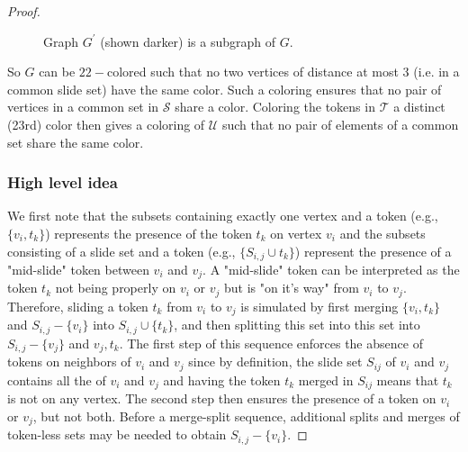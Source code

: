 \begin{proof}
\begin{figure} [H]
  \caption{Graph $G^{'}$ (shown darker) is a subgraph of $G$.}
  \label{fig:subgraph}
\end{figure}


So $G$ can be $22-$colored such that no two vertices of distance at most $3$ (i.e. in a common slide set) have the same color. Such a coloring
ensures that no pair of vertices in a common set in $\mathcal{S}$ share a color. Coloring the tokens in $\mathcal{T}$ a distinct (23rd) color
then gives a coloring of $\mathcal{U}$ such that no pair of elements of a common set share the same color.

\subsubsection{High level idea}
We first note that the subsets containing exactly one vertex and a token (e.g., $\{v_i, t_k\}$) represents the presence of the token
$t_k$ on vertex $v_i$ and the subsets consisting of a slide set and a token (e.g., $\{S_{i,j} \cup t_k\}$) represent the presence of a
"mid-slide" token between $v_i$ and $v_j$. A "mid-slide" token can be interpreted as the token $t_k$ not being properly on $v_i$ or $v_j$ but is
"on it's way" from $v_i$ to $v_j$. Therefore, sliding a token $t_k$ from $v_i$ to $v_j$ is simulated by first
merging $\{v_i, t_k\}$ and $S_{i,j}-\{v_i\}$ into $S_{i,j} \cup \{t_k\}$, and then splitting this set into this set into $S_{i,j}-\{v_j\}$
and ${v_j, t_k}$. The first step of this sequence enforces the absence of tokens on neighbors of $v_i$ and $v_j$ since by definition, the slide
set $S_{ij}$ of $v_i$ and $v_j$ contains all the of $v_i$ and $v_j$ and having the token $t_k$  merged in $S_{ij}$ means that $t_k$ is not on any
vertex. The second step then ensures the presence of a token on $v_i$ or $v_j$, but not both.
Before a merge-split sequence, additional splits and merges of token-less sets may be needed to obtain $S_{i,j}-\{v_i\}$.


\end{proof}
